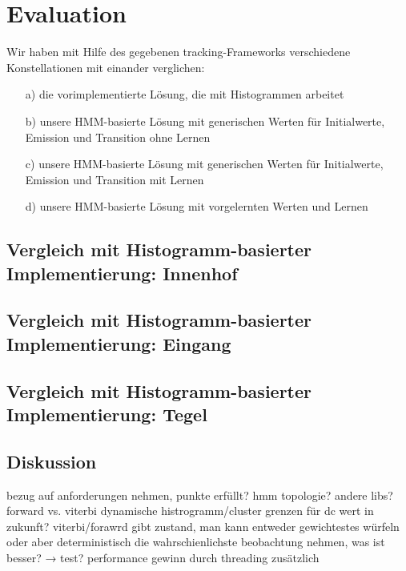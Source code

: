 \chapter{Evaluation}
Wir haben mit Hilfe des gegebenen tracking-Frameworks verschiedene Konstellationen mit einander verglichen:
\begin{itemize}
	\item[a)] die vorimplementierte Lösung, die mit Histogrammen arbeitet
	\item[b)] unsere HMM-basierte Lösung mit generischen Werten für Initialwerte, Emission und Transition ohne Lernen
	\item[c)] unsere HMM-basierte Lösung mit generischen Werten für Initialwerte, Emission und Transition mit Lernen
	\item[d)] unsere HMM-basierte Lösung mit vorgelernten Werten und Lernen
\end{itemize}
\section{Vergleich mit Histogramm-basierter Implementierung: Innenhof}

\section{Vergleich mit Histogramm-basierter Implementierung: Eingang}

\section{Vergleich mit Histogramm-basierter Implementierung: Tegel}

\section{Diskussion}
 bezug auf anforderungen nehmen, punkte erfüllt?
 hmm topologie?
 andere libs?
 forward vs. viterbi
 dynamische histrogramm/cluster grenzen für dc wert in zukunft?
 viterbi/forawrd gibt zustand, man kann entweder gewichtestes würfeln oder aber deterministisch die wahrschienlichste beobachtung nehmen, was ist besser? → test?
 performance gewinn durch threading zusätzlich
 

